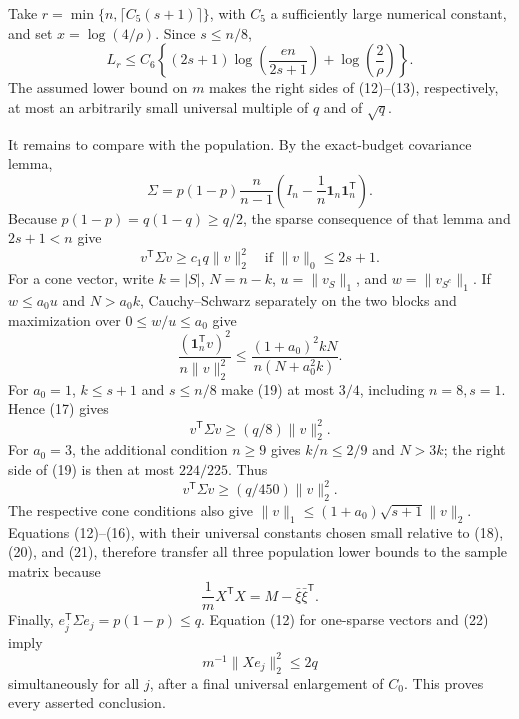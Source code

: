 Take \(r=\min\{n,\lceil C_5(s+1)\rceil\}\), with \(C_5\) a sufficiently large numerical constant, and set \(x=\log(4/\rho)\).  Since \(s\le n/8\),
\[
 L_r\le C_6\left\{(2s+1)\log\!\left(\frac{en}{2s+1}\right)
                       +\log\!\left(\frac2\rho\right)\right\}.
 \tag{16}
\]
The assumed lower bound on \(m\) makes the right sides of (12)--(13), respectively, at most an arbitrarily small universal multiple of \(q\) and of \(\sqrt q\).

It remains to compare with the population.  By the exact-budget covariance lemma,
\[
 \Sigma=p(1-p)\frac{n}{n-1}
 \left(I_n-\frac1n\mathbf 1_n\mathbf 1_n^{\mathsf T}\right).
 \tag{17}
\]
Because \(p(1-p)=q(1-q)\ge q/2\), the sparse consequence of that lemma and \(2s+1<n\) give
\[
 v^{\mathsf T}\Sigma v\ge c_1q\lVert v\rVert_2^2
 \quad\text{if }\lVert v\rVert_0\le2s+1.
 \tag{18}
\]
For a cone vector, write \(k=|S|\), \(N=n-k\), \(u=\lVert v_S\rVert_1\), and \(w=\lVert v_{S^c}\rVert_1\).  If \(w\le a_0u\) and \(N>a_0k\), Cauchy--Schwarz separately on the two blocks and maximization over \(0\le w/u\le a_0\) give
\[
 \frac{(\mathbf 1_n^{\mathsf T}v)^2}{n\lVert v\rVert_2^2}
 \le \frac{(1+a_0)^2kN}{n(N+a_0^2k)}.
 \tag{19}
\]
For \(a_0=1\), \(k\le s+1\) and \(s\le n/8\) make (19) at most \(3/4\), including \(n=8,s=1\).  Hence (17) gives
\[
 v^{\mathsf T}\Sigma v\ge(q/8)\lVert v\rVert_2^2.
 \tag{20}
\]
For \(a_0=3\), the additional condition \(n\ge9\) gives \(k/n\le2/9\) and \(N>3k\); the right side of (19) is then at most \(224/225\).  Thus
\[
 v^{\mathsf T}\Sigma v\ge(q/450)\lVert v\rVert_2^2.
 \tag{21}
\]
The respective cone conditions also give \(\lVert v\rVert_1\le(1+a_0)\sqrt{s+1}\lVert v\rVert_2\).  Equations (12)--(16), with their universal constants chosen small relative to (18), (20), and (21), therefore transfer all three population lower bounds to the sample matrix because
\[
 \frac1mX^{\mathsf T}X=M-\bar\xi\bar\xi^{\mathsf T}.
 \tag{22}
\]
Finally, \(e_j^{\mathsf T}\Sigma e_j=p(1-p)\le q\).  Equation (12) for one-sparse vectors and (22) imply
\[
 m^{-1}\lVert Xe_j\rVert_2^2\le2q
\]
simultaneously for all \(j\), after a final universal enlargement of \(C_0\).  This proves every asserted conclusion.